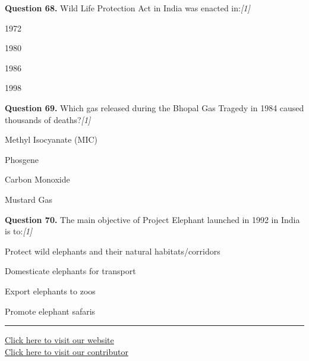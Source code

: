 \documentclass[11pt,a4paper]{article}
\newcommand{\pts}[1]{\hfill   \textit{[#1]}}
\begin{document}
\medskip


\noindent   \textbf{Question 68.} Wild Life Protection Act in India was enacted in:\pts{1}

\begin{parts}
  \item 1972
  \item 1980
  \item 1986
  \item 1998
\end{parts}

\medskip


\noindent   \textbf{Question 69.} Which gas released during the Bhopal Gas Tragedy in 1984 caused thousands of deaths?\pts{1}

\begin{parts}
  \item Methyl Isocyanate (MIC)
  \item Phosgene
  \item Carbon Monoxide
  \item Mustard Gas
\end{parts}

\medskip


\noindent   \textbf{Question 70.} The main objective of Project Elephant launched in 1992 in India is to:\pts{1}

\begin{parts}
  \item Protect wild elephants and their natural habitats/corridors
  \item Domesticate elephants for transport
  \item Export elephants to zoos
  \item Promote elephant safaris
\end{parts}

\medskip

\vfill
\rule{\linewidth}{0.4pt}

\begin{center}\small
\href{https://bhu-exam.vercel.app/}{Click here to visit our website}\\[4pt]
\href{https://me-aryan.vercel.app/}{Click here to visit our contributor}
\end{center}
\end{document}
